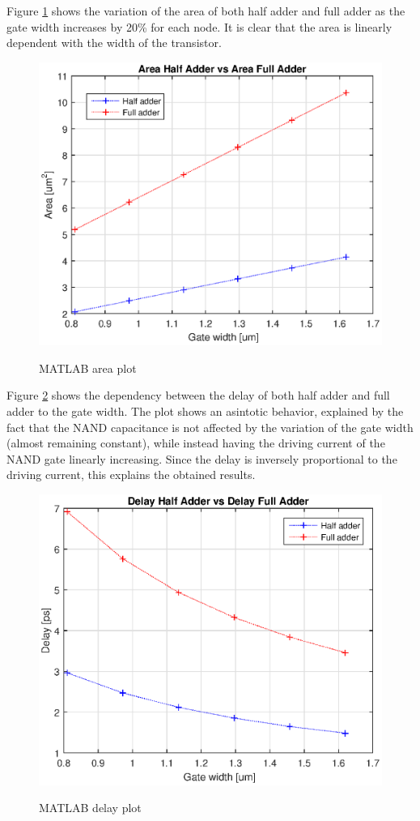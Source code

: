 Figure \ref{area_rep} shows the variation of the area of both half adder and full adder as the gate width increases by 20\% for each node. It is clear that the area is linearly dependent with the width of the transistor.
\begin{figure}[h]
	\caption{MATLAB area plot}
	\includegraphics{img/area_rep}
	\centering
	\label{area_rep}
\end{figure}

\newpage
Figure \ref{delay_rep} shows the dependency between the delay of both half adder and full adder to the gate width. The plot shows an asintotic behavior, explained by the fact that the NAND capacitance is not affected by the variation of the gate width (almost remaining constant), while instead having the driving current of the NAND gate linearly increasing. Since the delay is inversely proportional to the driving current, this explains the obtained results.
\begin{figure}[h]
	\caption{MATLAB delay plot}
	\includegraphics{img/delay_rep}
	\centering
	\label{delay_rep}
\end{figure}

